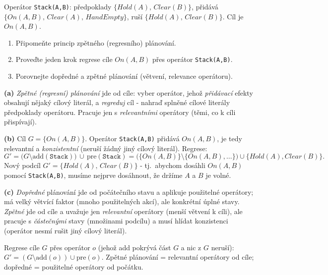 \begin{zadani}
Operátor \texttt{Stack(A,B)}: předpoklady $\{Hold(A),\,Clear(B)\}$, přidává $\{On(A,B),\,Clear(A),\,HandEmpty\}$, ruší $\{Hold(A),\,Clear(B)\}$. Cíl je $On(A,B)$.
\begin{enumerate}[label=(\alph*)]
  \item {} Připomeňte princip zpětného (regresního) plánování.
  \item {} Proveďte jeden krok regrese cíle $On(A,B)$ přes operátor \texttt{Stack(A,B)}.
  \item {} Porovnejte dopředné a zpětné plánování (větvení, relevance operátoru).
\end{enumerate}
\end{zadani}

\begin{reseni}
\textbf{(a)} \emph{Zpětné (regresní) plánování} jde od cíle: vyber operátor, jehož \emph{přidávací} efekty obsahují nějaký cílový literál, a \emph{regreduj} cíl - nahraď splněné cílové literály předpoklady operátoru. Pracuje jen s \emph{relevantními} operátory (těmi, co k cíli přispívají).

\textbf{(b)} Cíl $G=\{On(A,B)\}$. Operátor \texttt{Stack(A,B)} přidává $On(A,B)$, je tedy relevantní a \emph{konzistentní} (neruší žádný jiný cílový literál). Regrese:
\[
G' = \big(G\setminus \text{add}(\texttt{Stack})\big)\,\cup\,\text{pre}(\texttt{Stack}) = \big(\{On(A,B)\}\setminus\{On(A,B),\dots\}\big)\cup\{Hold(A),Clear(B)\}.
\]
Nový podcíl $G'=\{Hold(A),\,Clear(B)\}$ - tj.\ abychom dosáhli $On(A,B)$ pomocí \texttt{Stack(A,B)}, musíme nejprve dosáhnout, že držíme $A$ a $B$ je volné.

\textbf{(c)} \emph{Dopředné} plánování jde od počátečního stavu a aplikuje použitelné operátory; má velký větvící faktor (mnoho použitelných akcí), ale konkrétní úplné stavy. \emph{Zpětné} jde od cíle a uvažuje jen \emph{relevantní} operátory (menší větvení k cíli), ale pracuje s \emph{částečnými} stavy (množinami podcílu) a musí hlídat konzistenci (operátor nesmí rušit jiný cílový literál).
\end{reseni}

\begin{jadro}
Regrese cíle $G$ přes operátor $o$ (jehož add pokrývá část $G$ a nic z $G$ neruší): $G'=(G\setminus\text{add}(o))\cup\text{pre}(o)$. Zpětné plánování = relevantní operátory od cíle; dopředné = použitelné operátory od počátku.
\end{jadro}

